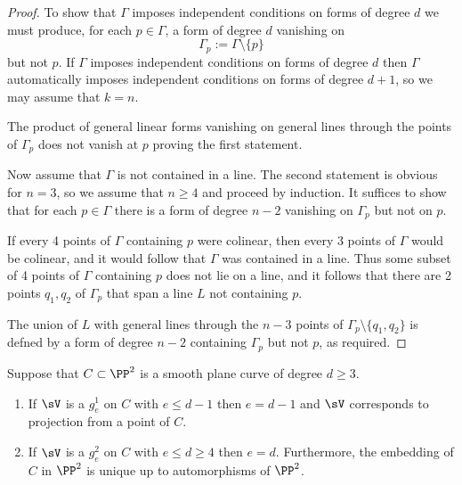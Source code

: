\begin{proof} To show that $\Gamma$ imposes independent conditions on forms of degree $d$ we must produce, for each $p\in \Gamma$, a form of degree $d$ vanishing on 
$$
\Gamma_{p}:=\Gamma\setminus\{p\}
$$
 but not $p$. If $\Gamma$ imposes independent conditions on forms of degree $d$ then
 $\Gamma$ automatically imposes independent conditions on forms of degree $d+1$,
 so we may assume that $k=n$.
 
The product of general linear forms
 vanishing on general lines through the points of $\Gamma_{p}$ does not vanish at $p$ proving the first statement.

Now assume that $\Gamma$ is not contained in a line. The second statement is obvious for $n=3$, so we assume that $n\geq 4$ and proceed by induction. 
It suffices to show that for each $p\in \Gamma$ there is a form of degree $n-2$ vanishing on $\Gamma_{p}$ but not on $p$.

If every 4 points of $\Gamma$ containing $p$ were colinear, then every 3 points of $\Gamma$ would be colinear, and it would follow that $\Gamma$ was contained in a  line. Thus
some subset of 4 points of $\Gamma$ containing $p$ does not lie on a line, and it follows that
there are 2 points $q_{1},q_{2}$ of $\Gamma_{p}$ that span a line $L$ not containing $p$.

The union of $L$ with general lines through the $n-3$ points of $\Gamma_{p}\setminus\{q_{1},q_{2}\}$ is defned by a form of degree $n-2$ containing $\Gamma_{p}$ but not $p$, 
as required. 
\end{proof}

\begin{corollary}\label{CBM cor 2}
 Suppose that $C\subset \PP^2$ is a smooth plane curve of degree $d\geq 3$.
 
\begin{enumerate}
 \item If $\sV$ is a $g^1_e$ on $C$ with $e\leq d-1$ then $e = d-1$ and $\sV$
 corresponds to projection from a point of $C$.
 \item If $\sV$ is a $g^2_e$ on $C$ with $e\leq d \geq 4$ then $e = d$. Furthermore,  the
  embedding of $C$ in $\PP^2$ is unique up to automorphisms of $\PP^2$.
 \end{enumerate}
\end{corollary}

